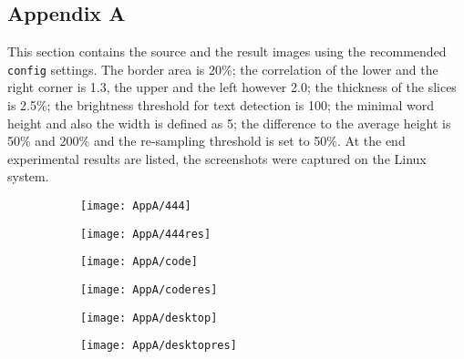 \documentclass[draft,final]{vutinfth} %
\begin{document}
	\begin{appendices}
		\chapter{Appendix A}
		\label{AppA}
		This section contains the source and the result images using the recommended \texttt{config} settings.
		The border area is 20\%; the correlation of the lower and the right corner is 1.3, the upper and the left however 2.0; the thickness of the slices is 2.5\%; the brightness threshold for text detection is 100; the minimal word height and also the width is defined as 5; the difference to the average height is 50\% and 200\% and the re-sampling threshold is set to 50\%.
		At the end experimental results are listed, the screenshots were captured on the Linux system.
		\begin{figure}[H]
			\centering
			\begin{subfigure}[b]{0.45\columnwidth}
				\centering
				\texttt{[image: AppA/444]}
			\end{subfigure}
			\begin{subfigure}[b]{0.45\columnwidth}
				\centering
				\texttt{[image: AppA/444res]}
			\end{subfigure}
		\end{figure}  
		\begin{figure}[H]
		\centering
		\begin{subfigure}[b]{0.45\columnwidth}
			\centering
			\texttt{[image: AppA/code]}
		\end{subfigure}
		\begin{subfigure}[b]{0.45\columnwidth}
			\centering
			\texttt{[image: AppA/coderes]}
		\end{subfigure}
		\end{figure}
		\begin{figure}[H]
		\centering
		\begin{subfigure}[b]{0.45\columnwidth}
			\centering
			\texttt{[image: AppA/desktop]}
		\end{subfigure}
		\begin{subfigure}[b]{0.45\columnwidth}
			\centering
			\texttt{[image: AppA/desktopres]}
		\end{subfigure}
		\end{figure}
		\begin{figure}[H]
		\centering
		\begin{subfigure}[b]{0.45\columnwidth}

\end{subfigure}
\end{figure}
\end{appendices}
\end{document}

